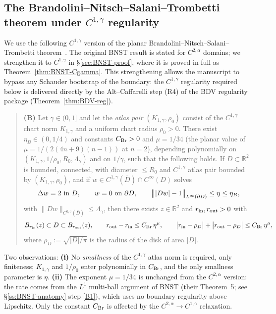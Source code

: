 \documentclass[11pt]{amsart}
\newcommand{\R}{\mathbb R}
\begin{document}
\subsection{The Brandolini--Nitsch--Salani--Trombetti theorem
under \texorpdfstring{$C^{1,\gamma}$}{C(1,gamma)} regularity}
\label{sec:BNST-import}

We use the following $C^{1,\gamma}$ version of the planar
Brandolini--Nitsch--Salani--Trombetti theorem~\cite{BNST}.  The
original BNST result is stated for $C^{2,\alpha}$ domains; we
strengthen it to $C^{1,\gamma}$ in \S\ref{sec:BNST-proof}, where it
is proved in full as Theorem~\ref{thm:BNST-Cgamma}.  This
strengthening allows the manuscript to bypass any Schauder bootstrap
of the boundary: the $C^{1,\gamma}$ regularity required below is
delivered directly by the Alt--Caffarelli step (R4) of the BDV
regularity package (Theorem~\ref{thm:BDV-reg}).

\begin{quote}
\textbf{(B)} Let $\gamma\in(0,1]$ and let the \emph{atlas pair}
$(K_{1,\gamma},\rho_0)$ consist of the $C^{1,\gamma}$ chart norm
$K_{1,\gamma}$ and a uniform chart radius $\rho_0>0$.  There exist
$\eta_B\in(0,1/4)$ and constants $C_{\rm Br}>0$ and $\mu=1/34$
\textup{(the planar value of $\mu=1/(2(4n+9)(n-1))$ at $n=2$)},
depending polynomially on $(K_{1,\gamma},1/\rho_0,R_0,\Lambda_\gamma)$
and on $1/\gamma$, such that the following holds.  If $D\subset\R^2$
is bounded, connected, with diameter $\le R_0$ and $C^{1,\gamma}$
atlas pair bounded by $(K_{1,\gamma},\rho_0)$, and if
$w\in C^{1,\gamma}(\overline D)\cap C^\infty(D)$ solves
\[
   \Delta w=2\ \hbox{in }D,
   \qquad
   w=0\ \hbox{on }\partial D,
   \qquad
   \bigl\||Dw|-1\bigr\|_{L^\infty(\partial D)}\le \eta\le\eta_B,
\]
with $\|Dw\|_{C^{0,\gamma}(\overline D)}\le\Lambda_\gamma$, then
there exists $z\in\R^2$ and $r_{\rm in},r_{\rm out}>0$ with
\begin{equation}\label{eq:brandolini-gap}
   B_{r_{\rm in}}(z)\subset D\subset B_{r_{\rm out}}(z),
   \qquad
   r_{\rm out}-r_{\rm in}\le C_{\rm Br}\,\eta^\mu,
   \qquad
   \bigl|r_{\rm in}-\rho_D\bigr|+\bigl|r_{\rm out}-\rho_D\bigr|
   \le C_{\rm Br}\,\eta^\mu,
\end{equation}
where $\rho_D:=\sqrt{|D|/\pi}$ is the radius of the disk of area
$|D|$.
\end{quote}

Two observations: \textbf{(i)} No \emph{smallness} of the
$C^{1,\gamma}$ atlas norm is required, only finiteness;
$K_{1,\gamma}$ and $1/\rho_0$ enter polynomially in $C_{\rm Br}$,
and the only smallness parameter is $\eta$.  \textbf{(ii)} The
exponent $\mu=1/34$ is unchanged from the $C^{2,\alpha}$ version:
the rate comes from the $L^1$ multi-ball argument of BNST (their
Theorem~5; see \S\ref{ss:BNST-anatomy} step \ref{B1}), which uses
no boundary regularity above Lipschitz.  Only the constant
$C_{\rm Br}$ is affected by the $C^{2,\alpha}\to C^{1,\gamma}$
relaxation.
\end{document}
